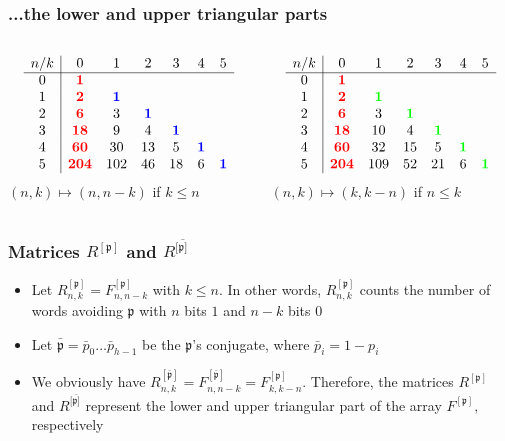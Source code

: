 \documentclass{beamer}
\begin{document}
\begin{frame}\frametitle{...the lower and upper triangular parts}
\begin{columns}
\begin{column}{5cm}
$$
\begin{array}{c|cccccc}
n/k  & 0 & 1 & 2 & 3 & 4 &5   \\ \cline{1-7}
0 & {\bf\color{red}1} & & & & & \\
1 & {\bf\color{red}2} & {\bf\color{blue} 1} & & &  & \\
2 & {\bf\color{red}6}& 3 & {\bf\color{blue} 1} & & & \\
3 & {\bf\color{red}18} & 9 & 4 & {\bf\color{blue} 1} & & \\
4 & {\bf\color{red}60} & 30 & 13 & 5 & {\bf\color{blue} 1}& \\
5 & {\bf\color{red}204} & 102 & 46 & 18 & 6 &{\bf\color{blue} 1} \\
\end{array}
$$
$(n,k)\mapsto(n,n-k)$ if $k\leq n$
\end{column}
\begin{column}{5cm}
$$
\begin{array}{c|cccccc}
n/k  & 0 & 1 & 2 & 3 & 4 &5   \\ \cline{1-7}
0 & {\bf\color{red}1} & & & & & \\
1 & {\bf\color{red}2} & {\bf\color{green}1} & & &  & \\
2 & {\bf\color{red}6}& 3 & {\bf\color{green}1} & & & \\
3 & {\bf\color{red}18} & 10 & 4 & {\bf\color{green}1} & & \\
4 & {\bf\color{red}60} & 32 & 15 & 5 & {\bf\color{green}1}&  \\
5 & {\bf\color{red}204} & 109 & 52 & 21 & 6 &{\bf\color{green}1} \\
\end{array}
$$
$(n,k)\mapsto(k,k-n)$ if $n\leq k$
\end{column}
\end{columns}
\end{frame}

\begin{frame}\frametitle{Matrices ${{R}^{[\mathfrak{p}]}}$ and  ${{R}^{[\bar{\mathfrak{p}]}}}$}
\begin{itemize}
\item Let $R_{n,k}^{[\mathfrak{p}]}=F_{n,n-k}^{[\mathfrak{p}]}$ with $k\leq n.$
In other words, $R_{n,k}^{[\mathfrak{p}]}$ counts the number of words avoiding
$\mathfrak{p}$ with $n$ bits $1$ and $n-k$  bits $0$ \item Let
$\bar{\mathfrak{p}}=\bar{p}_{0}\ldots\bar{p}_{h-1}$ be the $\mathfrak{p}$'s conjugate, 
where $\bar{p}_{i} = 1-p_{i}$
\item We obviously have
$R_{n,k}^{[\bar{\mathfrak{p}}]}=F_{n,n-k}^{[\bar{\mathfrak{p}}]}=F_{k,k-n}^{[\mathfrak{p}]}$.
Therefore, the matrices ${{R}^{[\mathfrak{p}]}}$ and
${{R}^{[\bar{\mathfrak{p}]}}}$ represent the lower and upper triangular part of
the array ${{F}^{[\mathfrak{p}]}},$ respectively
\end{itemize}

\end{frame}
\end{document}
